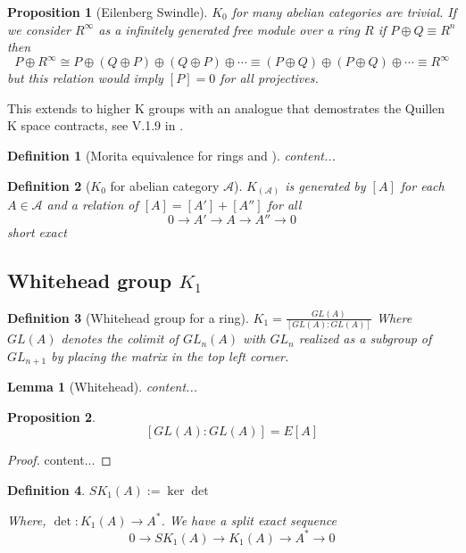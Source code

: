 \documentclass[12pt]{article}
\numberwithin{equation}{section}
\newtheorem{definition}{Definition}[section]
\newtheorem{lemma}[theorem]{Lemma}
\newtheorem{proposition}{Proposition}[section]
\begin{document}
	\begin{proposition}[Eilenberg Swindle]
		$K_0$ for many abelian categories are trivial. If we consider $R^\infty$ as a infinitely generated free module over a ring $R$ if $P \oplus Q \equiv R^n$ then \[ P \oplus R^\infty \cong P \oplus (Q \oplus P) \oplus (Q \oplus P) \oplus \cdots \equiv (P \oplus Q) \oplus (P \oplus Q) \oplus \cdots \equiv R^\infty \] but this relation would imply $[P]=0 $ for all projectives. 
	\end{proposition}
	This extends to higher K groups with an analogue that demostrates the Quillen K space contracts, see V.1.9 in \cite{weibel2013k}.
	
	\begin{definition}[Morita equivalence for rings and ]
		content...
	\end{definition}
	
	\begin{definition}[$K_0$ for abelian category $\mathcal{A}$]
		$K_(\mathcal A)$ is generated by $[A]$ for each $A \in \mathcal{A}$ and a relation of $[A]=[A']+[A'']$ for all \[ 0 \to A' \to A \to A'' \to 0 \]
		short exact
	\end{definition}
	
	\subsection{Whitehead group $K_1$}
	\begin{definition}[Whitehead group for a ring]
		$K_1= \frac{GL(A)}{[GL(A):GL(A)]}$
		Where $GL(A)$ denotes the colimit of $GL_n(A)$ with $GL_{n}$ realized as a subgroup of $GL_{n+1}$ by placing the matrix in the top left corner. 
	\end{definition}
	
	\begin{lemma}[Whitehead]
		content...
	\end{lemma}
	\begin{proposition}
		\[ [GL(A):GL(A)]=E[A] \]
	\end{proposition}
	\begin{proof}
		content...
	\end{proof}	
	
	\begin{definition}
		$SK_1(A):= \ker \det$
		
		Where, $\det : K_1(A) \to A^*$. We have a split exact sequence
		\[ 0 \to SK_1(A) \to K_1(A) \to A^* \to 0 \]
	\end{definition}
	
\end{document}
